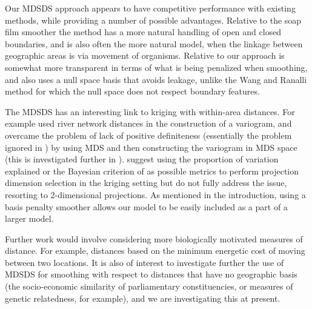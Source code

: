 \documentclass[smallextended]{svjour3}       %
\begin{document}
Our MDSDS approach appears to have competitive performance with existing methods, while providing a number of possible advantages. Relative to the soap film smoother the method has a more natural handling of open and closed boundaries, and is also often the more natural model, when the linkage between geographic areas is via movement of organisms. Relative to \cite{Wang:2007tf} our approach is somewhat more transparent in terms of what is being penalized when smoothing, and also uses a null space basis that avoids leakage, unlike the Wang and Ranalli method for which the null space does not respect boundary features. 

The MDSDS has an interesting link to kriging with within-area distances. For example \cite{Loland:2003tp} used river network distances in the construction of a variogram, and overcame the problem of lack of positive definiteness (essentially the problem ignored in \cite{Wang:2007tf}) by using MDS and then constructing the variogram in MDS space (this is investigated further in \cite{Curriero:2005ww}). \cite{Jensen:2006kn} suggest using the proportion of variation explained or the Bayesian criterion of \cite{Oh:2011ve} as possible metrics to perform projection dimension selection in the kriging setting but do not fully address the issue, resorting to 2-dimensional projections. As mentioned in the introduction, using a basis penalty smoother allows our model to be easily included as a part of a larger model.

Further work would involve considering more biologically motivated measures of distance. For example, distances based on the minimum energetic cost of moving between  two locations. It is also of interest to investigate further the use of MDSDS for smoothing with respect to distances that have no geographic basis (the socio-economic similarity of parliamentary constituencies, or measures of genetic relatedness, for example), and we are investigating this at present.
\end{document}
